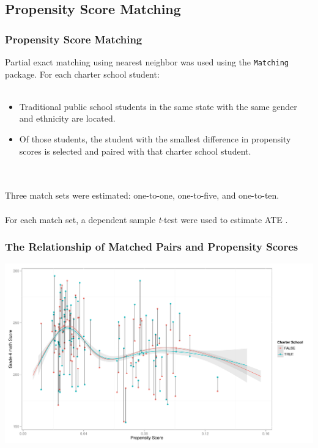 \documentclass[10pt,handout,mathserif]{beamer}
\begin{document}
\subsection{Propensity Score Matching}

\begin{frame}[c]
    \frametitle{Propensity Score Matching}
    Partial exact matching using nearest neighbor was used using the \texttt{Matching} \cite{matching} package. For each charter school student:
    \ \\\ \\
    \begin{itemize}
    \setlength{\itemsep}{10pt}
        \item Traditional public school students in the same state with the same gender and ethnicity are located.
        \item Of those students, the student with the smallest difference in propensity scores is selected and paired with that charter school student.
    \end{itemize}
    \ \\\ \\
    Three match sets were estimated: one-to-one, one-to-five, and one-to-ten.
    \ \\\ \\
    For each match set, a dependent sample \textit{t}-test were used to estimate ATE \cite{Austin2011}.
\end{frame}

\begin{frame}
    \frametitle{The Relationship of Matched Pairs and Propensity Scores}
    \begin{center}
    	\includegraphics[width=\textwidth,keepaspectratio]{../Figures2009/g4math-loess-matching}
    \end{center}
\end{frame}
\end{document}
